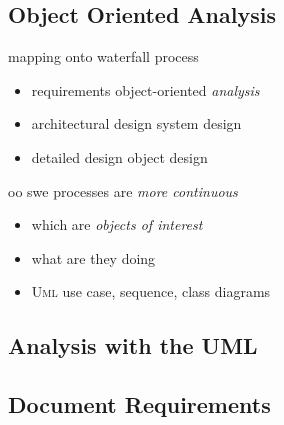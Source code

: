 \documentclass[a4paper, 10pt]{article}
\begin{document}
\subsection*{Object Oriented Analysis}
mapping onto waterfall process
\begin{itemize}
	\item requirements \follows object-oriented \emph{analysis}
	\item architectural design \follows system design
	\item detailed design \follows object design
\end{itemize}
oo swe processes are \emph{more continuous}
\begin{itemize}
	\item which are \emph{objects of interest}
	\item what are they doing
	\item \textsc{Uml} use case, sequence, class diagrams
\end{itemize}


\subsection*{Analysis with the UML}

\subsection*{Document Requirements}
\end{document}
